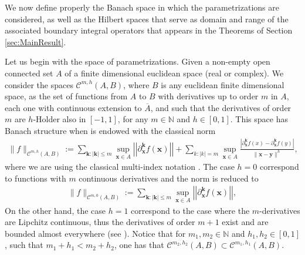 \documentclass{article}
\newcommand{\IN}{{\mathbb N}}
\newcommand{\cmspaceh}[4]{\mathcal{C}^{#1,#2} \left( #3, #4 \right)}
\newcommand{\bk}{\bm{k}}
\newcommand{\bx}{\bm{x}}
\newcommand{\by}{\bm{y}}
\begin{document}
We now define properly the Banach space in which the parametrizations are considered, as well as the Hilbert spaces that serve as domain and range of the associated boundary integral operators that appears in the Theorems of Section \ref{sec:MainResult}.

Let us begin with the space of parametrizations. Given a non-empty open connected set $A$ of a finite dimensional euclidean space (real or complex). We consider the spaces $\cmspaceh{m}{h}{A}{B}$, where $B$ is any euclidean finite dimensional space, as the set of functions from $A$ to $B$ with derivatives up to order $m$ in $A$, each one with continuous extension to $\overline{A}$, and such that the derivatives of order $m$ are $h$-Holder   also in $[-1,1]$, for any $m\in \IN$ and $h \in [0,1]$. This space has Banach structure when is endowed with the classical norm 
\begin{align*}
\| f \|_{\cmspaceh{m}{h}{A}{B}} := \sum_{\bk: |\bk| \leq m } \sup_{\bx \in A}  \left\vert\left\vert\partial_{\bx}^{\bk} f(\bx) \right\vert\right\vert+ \sum_{k: |k| =m} \sup_{\bx \in A}  \frac{|\partial_{\bx}^{\bk}f(x)-\partial_{\bx}^{\bk}f(y)|}{\| \bx - \by\|^h},
\end{align*}
where we are using the classical multi-index notation \cite[pg. 61]{mclean2000strongly}.  The case $h=0$ correspond to functions with $m$ continuous derivatives and the norm is reduced to 
\begin{align*}
\| f \|_{\cmspaceh{m}{0}{A}{B}} := \sum_{\bk: |\bk| \leq m } \sup_{\bx \in A}  \left\vert\left\vert\partial_{\bx}^{\bk} f(\bx) \right\vert\right\vert,
\end{align*}
On the other hand, the case $h=1$ correspond to the case where the $m$-derivatives are Lipchitz continuous, thus the derivatives of order $m+1$ exist and are bounded almost everywhere (see \cite[pg. 280]{evans1998partial}). Notice that for $m_1, m_2 \in \IN$ and $h_1, h_2 \in [0,1]$, such that $m_1 + h_1 < m_2 + h_2$, one has that $\cmspaceh{m_2}{h_2}{A}{B} \subset \cmspaceh{m_1}{h_1}{A}{B}$.
\end{document}
